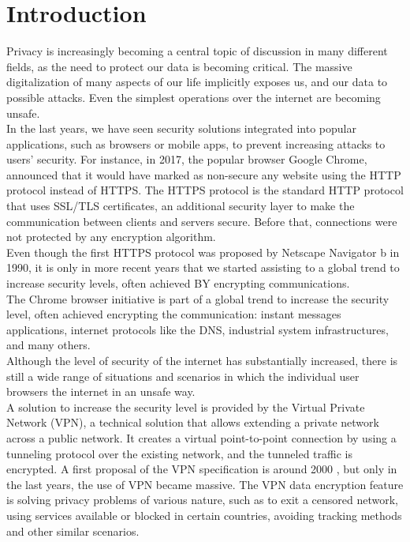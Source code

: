 \documentclass[12pt]{article}
\begin{document}
	\section{Introduction}
	Privacy is increasingly becoming a central topic of discussion in many different fields, as the need to protect our data is becoming critical. The massive digitalization of many aspects of our life implicitly exposes us, and our data to possible attacks. Even the simplest operations over the internet are becoming unsafe.\\
	In the last years, we have seen security solutions integrated into popular applications, such as browsers or mobile apps, to prevent increasing attacks to users' security. For instance, in 2017, the popular browser Google Chrome, announced that it would have marked as non-secure any website using the HTTP protocol instead of HTTPS. The HTTPS protocol is the standard HTTP protocol that uses SSL/TLS certificates, an additional security layer to make the communication between clients and servers secure. Before that, connections were not protected by any encryption algorithm.\\
	Even though the first HTTPS protocol was proposed by Netscape Navigator b in 1990, it is only in more recent years that we started assisting to a global trend to increase security levels, often achieved BY encrypting communications.\\
	The Chrome browser initiative is part of a global trend to increase the security level, often achieved encrypting the communication: instant messages applications, internet protocols like the DNS, industrial system infrastructures, and many others.\\
	Although the level of security of the internet has substantially increased, there is still a wide range of situations and scenarios in which the individual user browsers the internet in an unsafe way.\\
	A solution to increase the security level is provided by the Virtual Private Network (VPN), a technical solution that allows extending a private network across a public network. It creates a virtual point-to-point connection by using a tunneling protocol over the existing network, and the tunneled traffic is encrypted. A first proposal of the VPN specification is around 2000 \cite{VPNRFC}, but only in the last years, the use of VPN became massive. The VPN data encryption feature is solving privacy problems of various nature, such as to exit a censored network, using services available or blocked in certain countries, avoiding tracking methods and other similar scenarios.\\
\end{document}
